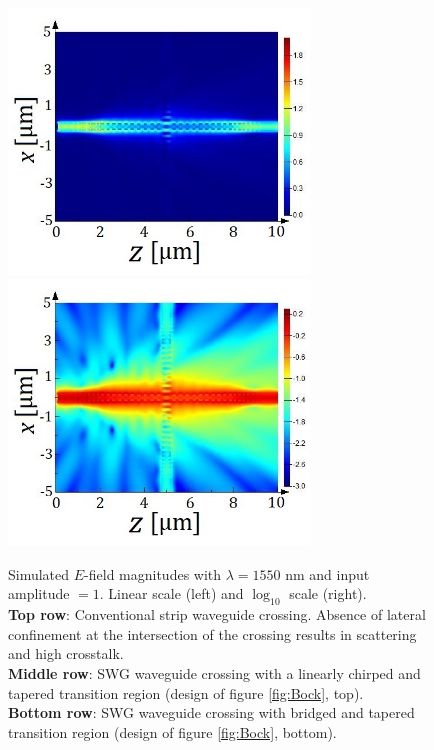 \documentclass[aps,prl,twocolumn, superscriptaddress]{revtex4}
\begin{document}
\begin{figure}[htbp]
    \includegraphics[width=8cm]{swg_bock_2.jpg}
    \includegraphics[width=8cm]{swg_bock_2_log.jpg}
    
    \caption{Simulated $E$-field magnitudes with $\lambda = 1550$ nm and input amplitude $=1$. Linear scale (left) and $\log_{10}$ scale (right). \\ \textbf{Top row}: Conventional strip waveguide crossing. Absence of lateral confinement at the intersection of the crossing results in scattering and high crosstalk. \\
    \textbf{Middle row}: SWG waveguide crossing with a linearly chirped and tapered transition region (design of figure \ref{fig:Bock}, top). \\
    \textbf{Bottom row}: SWG waveguide crossing with bridged and tapered transition region (design of figure \ref{fig:Bock}, bottom). }
    \label{fig:LumericalResults}
\end{figure}

\pagebreak
\end{document}
